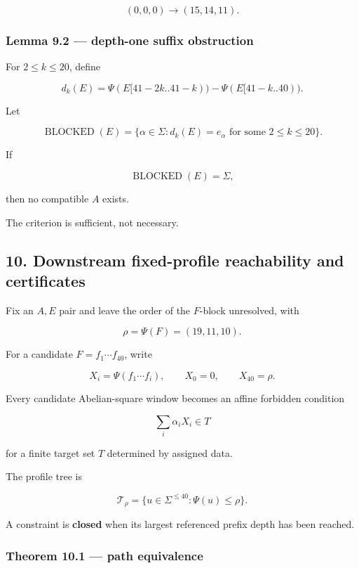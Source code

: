 \documentclass[
  british,
  a4paper,
  11pt]{article}
\begin{document}
\[
(0,0,0)\longrightarrow(15,14,11).
\]

\subsubsection{Lemma 9.2 --- depth-one suffix
obstruction}\label{lemma-9.2-depth-one-suffix-obstruction}

For \(2\le k\le20\), define

\[
d_k(E)
=
\Psi(E[41-2k..41-k))
-
\Psi(E[41-k..40)).
\]

Let

\[
\operatorname{BLOCKED}(E)
=
\{\alpha\in\Sigma:
d_k(E)=e_\alpha
\text{ for some }2\le k\le20\}.
\]

If

\[
\operatorname{BLOCKED}(E)=\Sigma,
\]

then no compatible \(A\) exists.

The criterion is sufficient, not necessary.

\subsection{10. Downstream fixed-profile reachability and
certificates}\label{downstream-fixed-profile-reachability-and-certificates}

Fix an \(A,E\) pair and leave the order of the \(F\)-block unresolved,
with

\[
\rho=\Psi(F)=(19,11,10).
\]

For a candidate \(F=f_1\cdots f_{40}\), write

\[
X_i=\Psi(f_1\cdots f_i),
\qquad
X_0=0,
\qquad
X_{40}=\rho.
\]

Every candidate Abelian-square window becomes an affine forbidden
condition

\[
\sum_i\alpha_iX_i\in T
\tag{10.1}
\]

for a finite target set \(T\) determined by assigned data.

The profile tree is

\[
\mathcal T_\rho
=
\{u\in\Sigma^{\le40}:\Psi(u)\le\rho\}.
\tag{10.2}
\]

A constraint is \textbf{closed} when its largest referenced prefix depth
has been reached.

\subsubsection{Theorem 10.1 --- path
equivalence}\label{theorem-10.1-path-equivalence}
\end{document}
